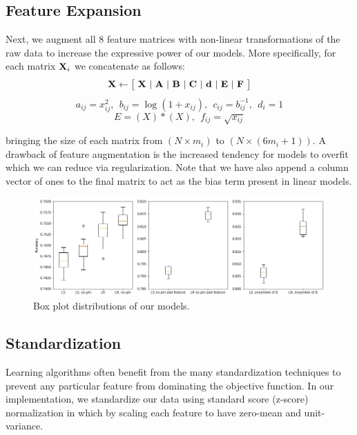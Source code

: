 \documentclass[10pt,conference,compsocconf]{IEEEtran}
\begin{document}
\subsection{Feature Expansion}
Next, we augment all 8 feature matrices with non-linear transformations of the raw data to increase the expressive power of our models. More specifically, for each matrix ${\textbf X_i}$ we concatenate as follows:
\vspace*{-1mm}
\begin{equation}
{\textbf X} \leftarrow \big[ \ {\textbf X} \ \vert \ {\textbf A} \ \vert \ {\textbf B} \ \vert \ {\textbf C} \ \vert \ {\textbf d} \ \vert \ {\textbf E} \ \vert \ {\textbf F} \ \big]
\end{equation}
\vspace*{-5mm}
\begin{equation}
a_{ij} = x_{ij}^2, \ \ b_{ij} = \log (1 + x_{ij}), \ \ c_{ij} = b_{ij}^{-1}, \ \ d_{i} = 1 
\end{equation}
\vspace*{-5mm}
\begin{equation}
E = (X)*(X), \ \ f_{ij} = \sqrt{x_{ij}}
\end{equation}

bringing the size of each matrix from $ (N \times m_i) $ to $ (N \times (6m_i + 1))$. A drawback of feature augmentation is the increased tendency for models to overfit which we can reduce via regularization. Note that we have also append a column vector of ones to the final matrix to act as the bias term present in linear models. 

\begin{figure}[t]
\begin{center}
  \includegraphics[width=\textwidth]{box1.jpg}
  \caption{Box plot distributions of our models.}
\end{center}
   \label{fig:boxplot}
\end{figure}

\subsection{Standardization}
Learning algorithms often benefit from the many standardization techniques to prevent any particular feature from dominating the objective function. In our implementation, we standardize our data using standard score (z-score) normalization in which by scaling each feature to have zero-mean and unit-variance.
\end{document}
